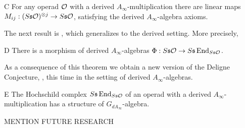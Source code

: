  \begin{manualtheorem}{C}
	For any operad ${\mathcal O}$ with a derived $A_\infty$-multiplication there are linear maps $M_{ij}:(S\mathfrak{s}{\mathcal O})^{\otimes j}\to S\mathfrak{s}{\mathcal O}$, satisfying the derived $A_\infty$-algebra axioms.
 \end{manualtheorem}
 The next result is , which generalizes  to the derived setting. More precisely,
 \begin{manualtheorem}{D}
There is a morphism of derived $A_\infty$-algebras $\Phi:S\mathfrak{s}{\mathcal O}\to S\mathfrak{s}\operatorname{End}_{S\mathfrak{s}{\mathcal O}}$.
\end{manualtheorem}
As a consequence of this theorem we obtain a new version of the Deligne Conjecture, , this time in the setting of derived $A_\infty$-algebras.
\begin{manualtheorem}{E}
The Hochschild complex $S\mathfrak{s}\operatorname{End}_{S\mathfrak{s}{\mathcal O}}$ of an operad with a derived $A_\infty$-multiplication has a structure of $G_{dA_\infty}$-algebra.
\end{manualtheorem} 

MENTION FUTURE RESEARCH